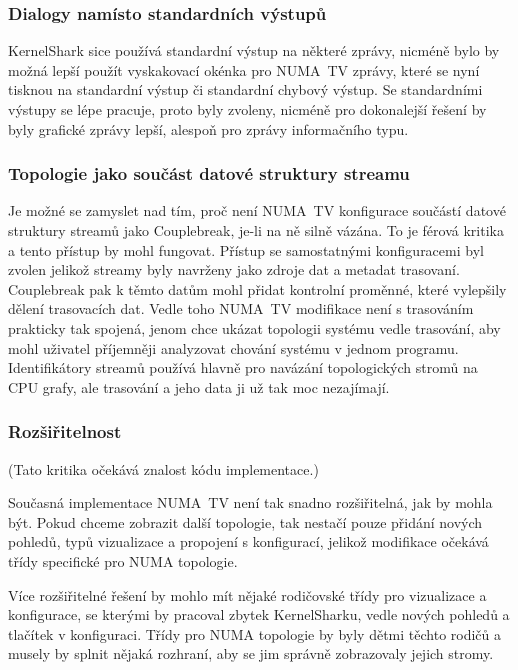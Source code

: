 \subsubsection*{Dialogy namísto standardních výstupů}
KernelShark sice používá standardní výstup na některé zprávy, nicméně bylo by možná lepší použít vyskakovací okénka pro NUMA~TV zprávy, které se nyní tisknou na standardní výstup či standardní chybový výstup. Se standardními výstupy se lépe pracuje, proto byly zvoleny, nicméně pro dokonalejší řešení by byly grafické zprávy lepší, alespoň pro zprávy informačního typu.

\subsubsection*{Topologie jako součást datové struktury streamu}
Je možné se zamyslet nad tím, proč není NUMA~TV konfigurace součástí datové struktury streamů jako Couplebreak, je-li na ně silně vázána. To je férová kritika a tento přístup by mohl fungovat. Přístup se samostatnými konfiguracemi byl zvolen jelikož streamy byly navrženy jako zdroje dat a metadat trasovaní. Couplebreak pak k těmto datům mohl přidat  kontrolní proměnné, které vylepšily dělení trasovacích dat. Vedle toho NUMA~TV modifikace není s trasováním prakticky tak spojená, jenom chce ukázat topologii systému vedle trasování, aby mohl uživatel příjemněji analyzovat chování systému v jednom programu. Identifikátory streamů používá hlavně pro navázání topologických stromů na CPU grafy, ale trasování a jeho data ji už tak moc nezajímají.

\subsubsection*{Rozšiřitelnost}
\label{rozšiřitelnost}
(Tato kritika očekává znalost kódu implementace.)

Současná implementace NUMA~TV není tak snadno rozšiřitelná, jak by mohla být. Pokud chceme zobrazit další topologie, tak nestačí pouze přidání nových pohledů, typů vizualizace a propojení s konfigurací, jelikož modifikace očekává třídy specifické pro NUMA topologie.

Více rozšiřitelné řešení by mohlo mít nějaké rodičovské třídy pro vizualizace a konfigurace, se kterými by pracoval zbytek KernelSharku, vedle nových pohledů a tlačítek v konfiguraci. Třídy pro NUMA topologie by byly dětmi těchto rodičů a musely by splnit nějaká rozhraní, aby se jim správně zobrazovaly jejich stromy.

